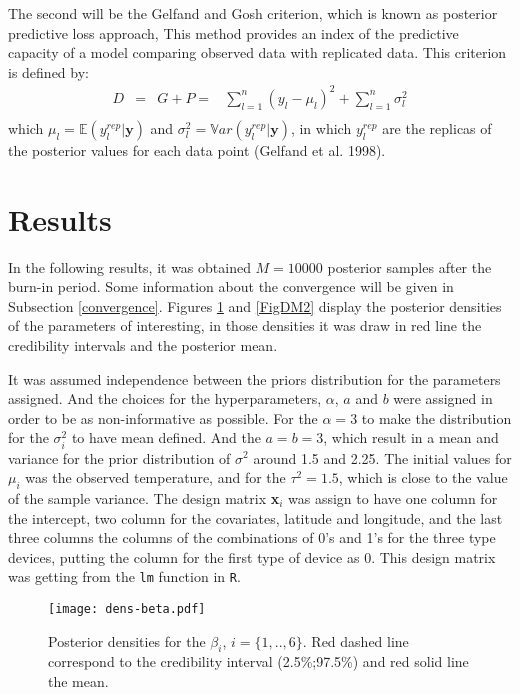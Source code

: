 \documentclass{asaproc}
\begin{document}
The second will be the Gelfand and Gosh criterion, which is known as posterior predictive loss approach, This method provides an index of the predictive capacity of a model comparing observed data with replicated data. This criterion is defined by:
\begin{equation*}
\begin{array}{lclllll}
D & = & G + P = & \displaystyle\sum_{l=1}^{n}(y_l - \mu_l)^2 + \displaystyle\sum_{l=1}^{n} \sigma^2_l\\
\end{array}
\end{equation*} 
\noindent
which $\mu_l = \mathds{E}(y_l^{rep}|\textbf{y})$ and $\sigma_l^2 =  \mathds{V}ar(y_l^{rep}|\textbf{y})$, in which $y_l^{rep}$ are the replicas of the posterior values for each data point (Gelfand et al. 1998).

\section{Results}

In the following results, it was obtained $M = 10000$ posterior samples after the burn-in period. Some information about the convergence will be given in Subsection \ref{convergence}. Figures \ref{FigDM1} and \ref{FigDM2} display the posterior densities of the parameters of interesting, in those densities it was draw in red line the credibility intervals and the posterior mean.

It was assumed independence between the priors distribution for the parameters assigned. And the choices for the hyperparameters, $\alpha$, $a$ and $b$ were assigned in order to be as non-informative as possible. For the $\alpha = 3$ to make the distribution for the $\sigma^2_i$ to have mean defined. And the $a=b=3$, which result in a mean and variance for the prior distribution of $\sigma^2$ around 1.5 and 2.25. The initial values for $\mu_i$ was the observed temperature, and for the $\tau^2 = 1.5$, which is close to the value of the sample variance. The design matrix \textbf{x}$_i$ was assign to have one column for the intercept, two column for the covariates, latitude and longitude, and the last three columns the columns of the combinations of 0's and 1's for the three type devices, putting the column for the first type of device as 0. This design matrix was getting from the \texttt{lm} function in \texttt{R}.

\begin{figure}[H]
\centering
\texttt{[image: dens-beta.pdf]}
\caption{Posterior densities for the $\beta_i$, $i=\{1, .., 6 \}$. Red dashed line correspond to the credibility interval (2.5\%;97.5\%) and red solid line the mean.}
\label{FigDM1}
\end{figure}
\end{document}

